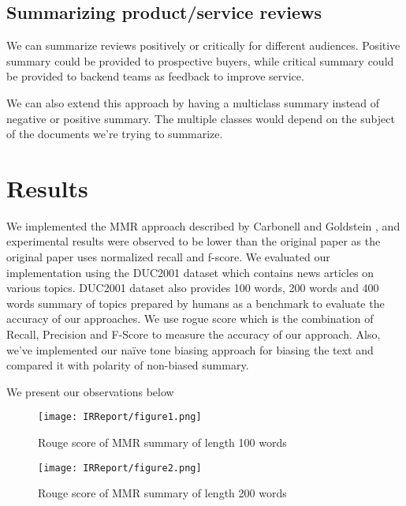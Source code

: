 \documentclass[conference]{IEEEtran}
\begin{document}
\subsection*{Summarizing product/service reviews}
We can summarize reviews positively or critically for different audiences. Positive summary could be provided to prospective buyers, while critical summary could be provided to backend teams as feedback to improve service.
\par
We can also extend this approach by having a multiclass summary instead of negative or positive summary. The multiple classes would depend on the subject of the documents we’re trying to summarize.  
 
\section{Results}
We implemented the MMR approach described by Carbonell and Goldstein \citep{paper1}, and experimental results were observed to be lower than the original paper as the original paper uses normalized recall and f-score. We evaluated our implementation using the DUC2001 dataset which contains news articles on various topics. DUC2001 dataset also provides 100 words, 200 words and 400 words summary of topics prepared by humans as a benchmark to evaluate the accuracy of our approaches. We use rogue score which is the combination of {Recall, Precision and F-Score} to measure the accuracy of our approach. Also, we’ve implemented our naïve tone biasing approach for biasing the text and compared it with polarity of non-biased summary.
\par
We present our observations below

\begin{figure}[h!]
\centering
\texttt{[image: IRReport/figure1.png]}
\caption{Rouge score of MMR summary of length 100 words}
\label{fig:Result1}
\end{figure}

\begin{figure}[h!]
\centering
\texttt{[image: IRReport/figure2.png]}
\caption{Rouge score of MMR summary of length 200 words}
\label{fig:Result2}
\end{figure}
\end{document}
